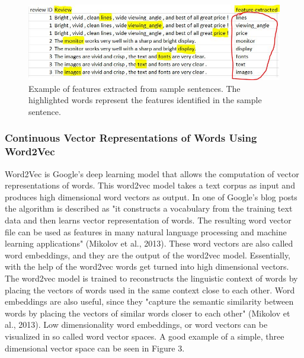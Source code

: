 \documentclass{sig-alternate}
\begin{document}
\begin{figure}
\centering
\includegraphics[scale=0.60]{images/feature_extraction.JPG}
\caption{Example of features extracted from sample sentences. The highlighted words represent the features identified in the sample sentence.}
\end{figure}

\subsubsection{Continuous Vector Representations of Words Using Word2Vec}
Word2Vec is Google's deep learning model that allows the computation of vector representations of words. This word2vec model takes a text corpus as input and produces high dimensional word vectors as output. In one of Google's blog posts the algorithm is described as "it constructs a vocabulary from the training text data and then learns vector representation of words. The resulting word vector file can be used as features in many natural language processing and machine learning applications" (Mikolov et al., 2013). 
These word vectors are also called word embeddings, and they are the output of the word2vec model. Essentially, with the help of the word2vec words get turned into high dimensional vectors. The word2vec model is trained to reconstructs the linguistic context of words by placing the vectors of words used in the same context close to each other. Word embeddings are also useful, since they "capture the semantic similarity between words by placing the vectors of similar words closer to each other" (Mikolov et al., 2013). Low dimensionality word embeddings, or word vectors can be visualized in so called word vector spaces. A good example of a simple, three dimensional vector space can be seen in Figure 3.
\end{document}
